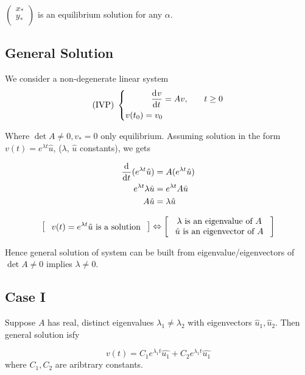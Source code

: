 \documentclass[12pt,twoside]{article}
\begin{document}
$
\begin{pmatrix}
  x_* \\ y_* \\
\end{pmatrix}
$ is an equilibrium solution for any $\alpha$.

\subsection{General Solution}
We consider a non-degenerate linear system
\begin{equation} \text{(IVP)}\;\left\{
  \begin{aligned}
    \frac{\mathrm{d}^{} {v}}{\mathrm{d}{t}^{}} &= Av, \quad& t&\ge0 \\
    v(t_0)=v_0 \\
  \end{aligned} \right.
\end{equation}

Where $\det A\ne0, v_*=0$ only equilibrium. Assuming solution in the form
$v(t)=e^{\lambda t}\hat{u}$, ($\lambda$, $\hat{u}$ constants), we gets

\begin{equation}
  \begin{aligned}
    \frac{\mathrm{d}^{} {}}{\mathrm{d}{t}^{}}(e^{\lambda t}\hat{u}) &= A(e^{\lambda t}\hat{u}) \\
    e^{\lambda t}\lambda\hat{u} &= e^{\lambda t}A\hat{u} \\
    A\hat{u} &= \lambda\hat{u}
  \end{aligned}
\end{equation}

\begin{equation}
  \left[ \text{\parbox{12em}{\centering $v(t)=e^{\lambda t}\hat{u}$ is a solution}}
 \right] \Leftrightarrow
  \left[ \parbox{12em}{\centering \text{$\lambda$ is an eigenvalue of $A$} \\
      \text{$\hat{u}$ is an eigenvector of $A$}} \right]
\end{equation}

Hence general solution of system can be built from eigenvalue/eigenvectors of
$\det A\ne0$ implies $\lambda\ne0$.

\subsection{Case I}
Suppose $A$ has real, distinct eigenvalues $\lambda_1\ne\lambda_2$ with
eigenvectors $\hat{u}_1,\hat{u}_2$. Then general solution isfy

$$v(t)= C_1e^{\lambda_1 t}\hat{u_1} + C_2e^{\lambda_1 t}\hat{u_1}$$ where
$C_1,C_2$ are aribtrary constants.
\end{document}
